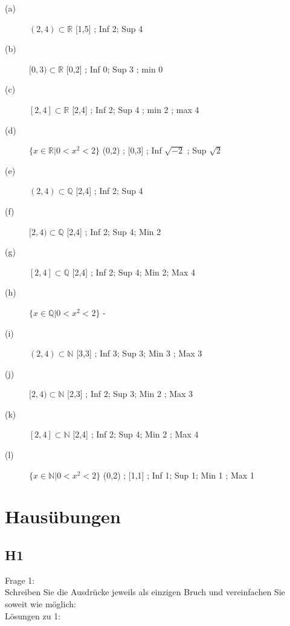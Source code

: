 \documentclass[12pt,a4paper]{article}
\begin{document}
\begin{description}
\item[(a)]{$(2,4) \subset \mathbb{R} $ [1,5] ; Inf 2; Sup 4}
\item[(b)]{$[0,3) \subset \mathbb{R} $ [0,2] ; Inf 0; Sup 3 ; min 0}
\item[(c)]{$[2,4] \subset \mathbb{R} $ [2,4] ; Inf 2; Sup 4 ; min 2 ; max 4}
\item[(d)]{$\{x \in \mathbb{R} | 0 < x^2 < 2\} $ (0,2) ; [0,3] ; Inf $\sqrt{-2}$ ; Sup $\sqrt{2}$}
\item[(e)]{$(2,4) \subset \mathbb{Q} $ [2,4] ; Inf 2; Sup 4}
\item[(f)]{$[2,4) \subset \mathbb{Q} $ [2,4] ; Inf 2; Sup 4; Min 2}
\item[(g)]{$[2,4] \subset \mathbb{Q} $ [2,4] ; Inf 2; Sup 4; Min 2; Max 4}
\item[(h)]{$\{x \in \mathbb{Q} | 0 < x^2 < 2\} $ -}
\item[(i)]{$(2,4) \subset \mathbb{N} $ [3,3] ; Inf 3; Sup 3; Min 3 ; Max 3}
\item[(j)]{$[2,4) \subset \mathbb{N} $ [2,3] ; Inf 2; Sup 3; Min 2 ; Max 3}
\item[(k)]{$[2,4] \subset \mathbb{N} $ [2,4] ; Inf 2; Sup 4; Min 2 ; Max 4}
\item[(l)]{$\{x \in \mathbb{N} | 0 < x^2 < 2\} $ (0,2) ; [1,1] ; Inf 1; Sup 1; Min 1 ; Max 1}
\end{description}

\section{Hausübungen}

\subsection{H1}

Frage 1:
\\[2ex]
Schreiben Sie die Ausdrücke jeweils als einzigen Bruch und vereinfachen Sie soweit wie möglich:
\\[2ex]
Lösungen zu 1:
\end{document}
